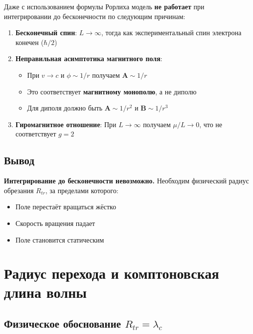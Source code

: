 \documentclass[12pt,a4paper]{article}
\begin{document}
Даже с использованием формулы Рорлиха модель \textbf{не работает} при интегрировании до бесконечности по следующим причинам:

\begin{enumerate}
    \item \textbf{Бесконечный спин}: $L \to \infty$, тогда как экспериментальный спин электрона конечен ($\hbar/2$)

    \item \textbf{Неправильная асимптотика магнитного поля}:
    \begin{itemize}
        \item При $v \to c$ и $\phi \sim 1/r$ получаем $\mathbf{A} \sim 1/r$
        \item Это соответствует \textbf{магнитному монополю}, а не диполю
        \item Для диполя должно быть $\mathbf{A} \sim 1/r^2$ и $\mathbf{B} \sim 1/r^3$
    \end{itemize}

    \item \textbf{Гиромагнитное отношение}: При $L \to \infty$ получаем $\mu/L \to 0$, что не соответствует $g=2$
\end{enumerate}

\subsection{Вывод}

\textbf{Интегрирование до бесконечности невозможно.} Необходим физический радиус обрезания $R_{tr}$, за пределами которого:
\begin{itemize}
    \item Поле перестаёт вращаться жёстко
    \item Скорость вращения падает
    \item Поле становится статическим
\end{itemize}

\section{Радиус перехода и комптоновская длина волны}

\subsection{Физическое обоснование $R_{tr} = \lambda_c$}
\end{document}
